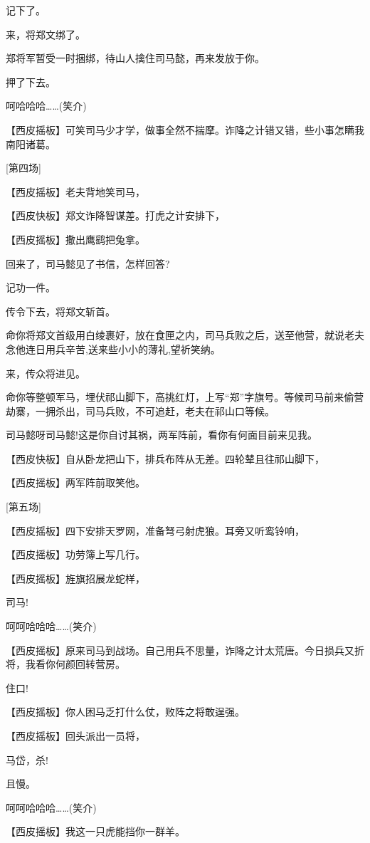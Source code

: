 记下了。

来，将郑文绑了。

郑将军暂受一时捆绑，待山人擒住司马懿，再来发放于你。

押了下去。

呵哈哈哈\ldots{}\ldots{}(笑介)

【西皮摇板】可笑司马少才学，做事全然不揣摩。诈降之计错又错，些小事怎瞒我南阳诸葛。

{[}第四场{]}

【西皮摇板】老夫背地笑司马，

【西皮快板】郑文诈降智谋差。打虎之计安排下，

【西皮摇板】撒出鹰鹞把兔拿。

回来了，司马懿见了书信，怎样回答?

记功一件。

传令下去，将郑文斩首。

命你将郑文首级用白绫裹好，放在食匣之内，司马兵败之后，送至他营，就说老夫念他连日用兵辛苦,送来些小小的薄礼,望祈笑纳。

来，传众将进见。

命你等整顿军马，埋伏祁山脚下，高挑红灯，上写``郑''字旗号。等候司马前来偷营劫寨，一拥杀出，司马兵败，不可追赶，老夫在祁山口等候。

司马懿呀司马懿!这是你自讨其祸，两军阵前，看你有何面目前来见我。

【西皮快板】自从卧龙把山下，排兵布阵从无差。四轮辇且往祁山脚下，

【西皮摇板】两军阵前取笑他。

{[}第五场{]}

【西皮摇板】四下安排天罗网，准备弩弓射虎狼。耳旁又听鸾铃响，

【西皮摇板】功劳簿上写几行。

【西皮摇板】旌旗招展龙蛇样，

司马!

呵呵哈哈哈\ldots{}\ldots{}(笑介)

【西皮摇板】原来司马到战场。自己用兵不思量，诈降之计太荒唐。今日损兵又折将，我看你何颜回转营房。

住口!

【西皮摇板】你人困马乏打什么仗，败阵之将敢逞强。

【西皮摇板】回头派出一员将，

马岱，杀!

且慢。

呵呵哈哈哈\ldots{}\ldots{}(笑介)

【西皮摇板】我这一只虎能挡你一群羊。

